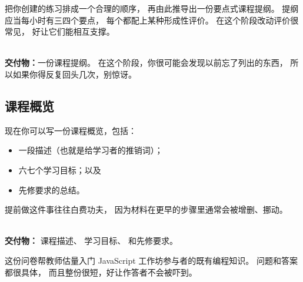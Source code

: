 把你创建的练习排成一个合理的顺序，
再由此推导出一份要点式课程提纲。
提纲应当每小时有三四个要点，
每个都配上某种形成性评价。
在这个阶段改动评价很常见，
好让它们能相互支撑。

~\\
\noindent
\textbf{交付物：}一份课程提纲。
在这个阶段，你很可能会发现以前忘了列出的东西，
所以如果你得反复回头几次，别惊讶。

\subsection*{课程概览}

现在你可以写一份课程概览，包括：

\begin{itemize}

\item
  一段描述（也就是给学习者的推销词）；

\item
  六七个学习目标；以及

\item
  先修要求的总结。

\end{itemize}

提前做这件事往往白费功夫，
因为材料在更早的步骤里通常会被增删、挪动。

~\\
\noindent
\textbf{交付物：}
课程描述、
学习目标、
和先修要求。


这份问卷帮教师估量入门 JavaScript 工作坊参与者的既有编程知识。
问题和答案都很具体，
而且整份很短，好让作答者不会被吓到。

